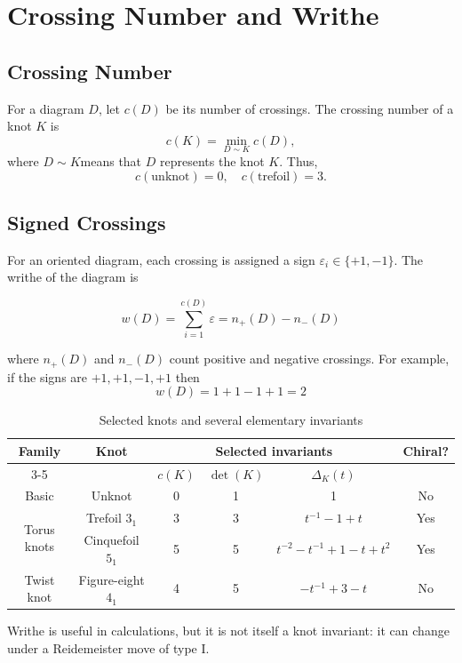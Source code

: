 \section{Crossing Number and Writhe}
\subsection{ Crossing Number}
For a diagram $D$, let $c(D)$ be its number of crossings.
The crossing number of a knot $K$ is
\begin{equation}
    c(K) = \min_{D\sim K} c(D),
\end{equation}
where $D \sim K $means that $D$ represents the knot $K$.
Thus,
\[
c(\text{unknot}) =0 ,\quad c(\text{trefoil}) = 3.
\]



\subsection{Signed Crossings}
For an oriented diagram, each crossing is assigned a sign
$\varepsilon_i \in \{+1,-1\}$. The writhe of the diagram is

\begin{equation}
    w(D) = \sum_{i=1}^{c(D)} \varepsilon = n_+(D) - n_-(D)
    \label{eq:three}
\end{equation}

where $n_+(D)$ and $n_-(D)$ count positive and negative crossings. For example, if the signs are $+1, +1, -1, +1$ then
\[
w(D) = 1+1 -1 +1 = 2
\]


\begin{table}[t]
    \centering
    \caption{ Selected knots and several elementary invariants}
    \label{tab:inv}
    \begin{tabular}{|c|c|c|c|c|c|}
    \hline
     \multirow{2}{*}{\bfseries Family} & \multirow{2}{*}{\bfseries Knot} & \multicolumn{3}{c|}{\bfseries Selected invariants} & \multirow{2}{*}{\bfseries Chiral?} \\
     \cline{3-5}
     & & $c(K)$ & $\det(K)$ & $\Delta_K(t)$ & \\
     \hline
    Basic & Unknot & 0 & 1 & 1 & No \\
    \hline
    \multirow{2}{*}{Torus knots} & Trefoil $3_1$ &3 & 3 & $t^{-1} -1  + t$ & Yes \\
    \cline{2-6}
    & Cinquefoil $5_1$ & 5 & 5 & $t^{-2} - t ^{-1} + 1 - t + t^2$ & Yes\\
    \hline
    Twist knot & Figure-eight  $4_1$ & 4 & 5& $-t^{-1} + 3 - t$ & No \\
    \hline
    \end{tabular}

\end{table}

Writhe is useful in calculations, but it is not itself a
knot invariant: it can change under a Reidemeister move
of type I.